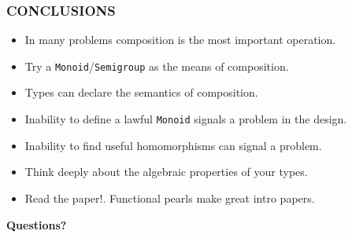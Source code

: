 \documentclass{beamer}
\begin{document}
\begin{frame} \frametitle{CONCLUSIONS}
  \begin{itemize}
    \item In many problems \alert{composition is the most important operation.}
    \item Try a \texttt{Monoid}/\texttt{Semigroup} as the means of composition.
    \item \alert{Types} can declare the \alert{semantics of composition.}
    \item Inability to define a lawful \texttt{Monoid} signals a problem in
        the design.
    \item Inability to find useful homomorphisms can signal a problem.
    \item Think deeply about the algebraic properties of your types.
    \item \alert{Read the paper!.} Functional pearls make great intro papers.
  \end{itemize}

  \begin{block}{}
    \centering
    \bf
    \Huge{Questions?}
  \end{block}
\end{frame}
\end{document}
